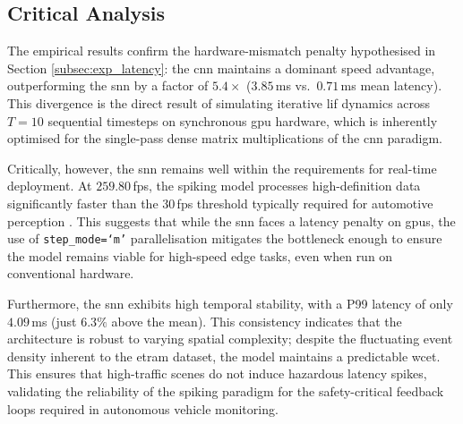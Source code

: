 \subsection*{Critical Analysis}

The empirical results confirm the hardware-mismatch penalty hypothesised in Section \ref{subsec:exp_latency}:
the \gls{cnn} maintains a dominant speed advantage, outperforming the \gls{snn} by a factor of $5.4\times$ ($3.85$\,ms vs.\ $0.71$\,ms mean latency).
This divergence is the direct result of simulating iterative \gls{lif} dynamics across $T=10$ sequential timesteps on synchronous \gls{gpu} hardware, which is inherently optimised for the single-pass dense matrix multiplications of the \gls{cnn} paradigm.

Critically, however, the \gls{snn} remains well within the requirements for real-time deployment. At $259.80$\,\gls{fps}, the spiking model processes high-definition data significantly faster than the $30$\,\gls{fps} threshold typically required for automotive perception \cite{khan2024real}. This suggests that while the \gls{snn} faces a latency penalty on \glspl{gpu}, the use of \texttt{step\_mode=`m'} parallelisation mitigates the bottleneck enough to ensure the model remains viable for high-speed edge tasks, even when run on conventional hardware.

Furthermore, the \gls{snn} exhibits high temporal stability, with a P99 latency of only $4.09$\,ms (just $6.3\%$ above the mean). This consistency indicates that the architecture is robust to varying spatial complexity; despite the fluctuating event density inherent to the \gls{etram} dataset, the model maintains a predictable \gls{wcet}. This ensures that high-traffic scenes do not induce hazardous latency spikes, validating the reliability of the spiking paradigm for the safety-critical feedback loops required in autonomous vehicle monitoring.